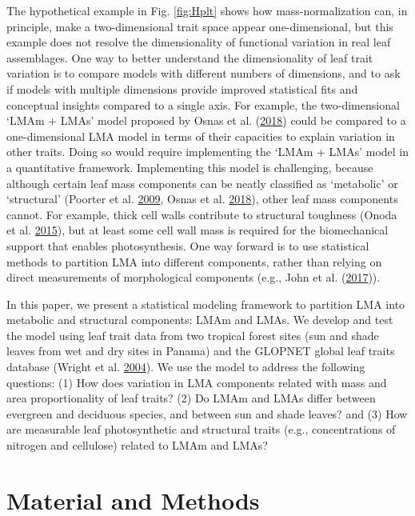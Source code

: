 \documentclass[
  12pt,
]{article}
\begin{document}
The hypothetical example in Fig. \ref{fig:Hplt} shows how mass-normalization can, in principle, make a two-dimensional trait space appear one-dimensional, but this example does not resolve the dimensionality of functional variation in real leaf assemblages.
One way to better understand the dimensionality of leaf trait variation is to compare models with different numbers of dimensions, and to ask if models with multiple dimensions provide improved statistical fits and conceptual insights compared to a single axis.
For example, the two-dimensional `LMAm + LMAs' model proposed by Osnas et al. (\protect\hyperlink{ref-Osnas2018}{2018}) could be compared to a one-dimensional LMA model in terms of their capacities to explain variation in other traits.
Doing so would require implementing the `LMAm + LMAs' model in a quantitative framework.
Implementing this model is challenging, because although certain leaf mass components can be neatly classified as `metabolic' or `structural' (Poorter et al. \protect\hyperlink{ref-Poorter2009}{2009}, Osnas et al. \protect\hyperlink{ref-Osnas2018}{2018}), other leaf mass components cannot.
For example, thick cell walls contribute to structural toughness (Onoda et al. \protect\hyperlink{ref-Onoda2015}{2015}), but at least some cell wall mass is required for the biomechanical support that enables photosynthesis.
One way forward is to use statistical methods to partition LMA into different components, rather than relying on direct measurements of morphological components (e.g., John et al. (\protect\hyperlink{ref-John2017}{2017})).

In this paper, we present a statistical modeling framework to partition LMA into metabolic and structural components: LMAm and LMAs.
We develop and test the model using leaf trait data from two tropical forest sites (sun and shade leaves from wet and dry sites in Panama) and the GLOPNET global leaf traits database (Wright et al. \protect\hyperlink{ref-Wright2004a}{2004}).
We use the model to address the following questions: (1) How does variation in LMA components related with mass and area proportionality of leaf traits? (2) Do LMAm and LMAs differ between evergreen and deciduous species, and between sun and shade leaves? and (3) How are measurable leaf photosynthetic and structural traits (e.g., concentrations of nitrogen and cellulose) related to LMAm and LMAs?

\hypertarget{material-and-methods}{%
\section{Material and Methods}\label{material-and-methods}}
\end{document}
